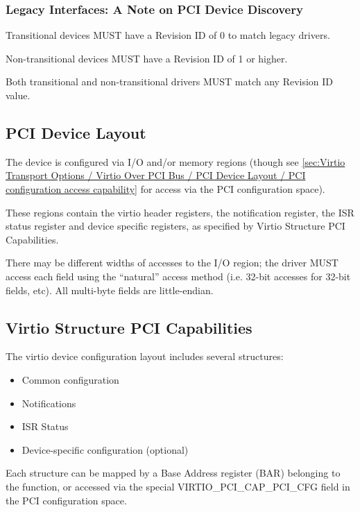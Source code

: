 \subsubsection{Legacy Interfaces: A Note on PCI Device Discovery}\label{sec:Virtio Transport Options / Virtio Over PCI Bus / PCI Device Discovery / Legacy Interfaces: A Note on PCI Device Discovery}
Transitional devices MUST have a Revision ID of 0 to match
legacy drivers.

Non-transitional devices MUST have a Revision ID of 1 or higher.

Both transitional and non-transitional drivers MUST match
any Revision ID value.

\subsection{PCI Device Layout}\label{sec:Virtio Transport Options / Virtio Over PCI Bus / PCI Device Layout}

The device is configured via I/O and/or memory regions (though see
\ref{sec:Virtio Transport Options / Virtio Over PCI Bus / PCI Device Layout / PCI configuration access capability}
for access via the PCI configuration space).

These regions contain the virtio header registers, the notification register, the
ISR status register and device specific registers, as specified by Virtio
Structure PCI Capabilities.

There may be different widths of accesses to the I/O region; the driver
MUST access each field using the “natural” access method (i.e. 32-bit accesses for 32-bit fields, etc).  All multi-byte fields are little-endian.

\subsection{Virtio Structure PCI Capabilities}\label{sec:Virtio Transport Options / Virtio Over PCI Bus / Virtio Structure PCI Capabilities}

The virtio device configuration layout includes several structures:
\begin{itemize}
\item Common configuration
\item Notifications
\item ISR Status
\item Device-specific configuration (optional)
\end{itemize}

Each structure can be mapped by a Base Address register (BAR) belonging to
the function, or accessed via the special VIRTIO_PCI_CAP_PCI_CFG field in the PCI configuration space.

